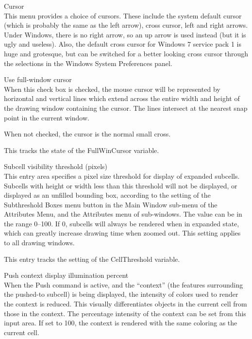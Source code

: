 \begin{description}

\item{\cb Cursor}\\
This menu provides a choice of cursors.  These include the system
default cursor (which is probably the same as the left arrow), cross
cursor, left and right arrows.  Under Windows, there is no right
arrow, so an up arrow is used instead (but it is ugly and useless). 
Also, the default cross cursor for Windows 7 service pack 1 is huge
and grotesque, but can be switched for a better looking cross cursor
through the selections in the Windows {\cb System Preferences}
panel.

\item{\cb Use full-window cursor}\\
When this check box is checked, the mouse cursor will be represented
by horizontal and vertical lines which extend across the entire width
and height of the drawing window containing the cursor.  The lines
intersect at the nearest snap point in the current window.
    
When not checked, the cursor is the normal small cross.

This tracks the state of the {\et FullWinCursor} variable.

\item{\cb Subcell visibility threshold (pixels)}\\
This entry area specifies a pixel size threshold for display of
expanded subcells.  Subcells with height or width less than this
threshold will not be displayed, or displayed as an unfilled bounding
box, according to the setting of the {\cb Subthreshold Boxes} menu
button in the {\cb Main Window} sub-menu of the {\cb Attributes Menu},
and the {\cb Attributes} menu of sub-windows.  The value can be in the
range 0--100.  If 0, subcells will always be rendered when in expanded
state, which can greatly increase drawing time when zoomed out.  This
setting applies to all drawing windows.

This entry tracks the setting of the {\et CellThreshold} variable.

\item{\cb Push context display illumination percent}\\
When the {\cb Push} command is active, and the ``context'' (the
features surrounding the pushed-to subcell) is being displayed, the
intensity of colors used to render the context is reduced.  This
visually differentiates objects in the current cell from those in the
context.  The percentage intensity of the context can be set from this
input area.  If set to 100, the context is rendered with the same
coloring as the current cell.


\end{description}
